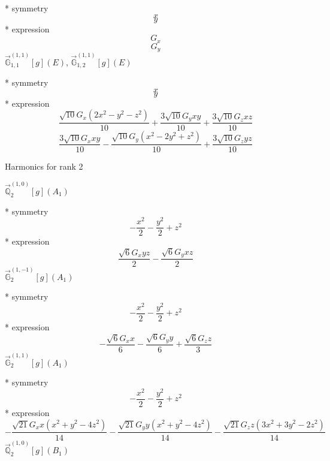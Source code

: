 \documentclass[fleqn,8pt]{jsarticle}
\begin{document}
\noindent\quad ** symmetry
\begin{dmath*}
x
\end{dmath*}
\begin{dmath*}
y
\end{dmath*}
\noindent\quad ** expression
\begin{dmath*}
G_{x}
\end{dmath*}
\begin{dmath*}
G_{y}
\end{dmath*}
\noindent\quad $\vec{\mathbb{G}}_{1,1}^{(1,1)}[g](E)$, $\vec{\mathbb{G}}_{1,2}^{(1,1)}[g](E)$

\noindent\quad ** symmetry
\begin{dmath*}
x
\end{dmath*}
\begin{dmath*}
y
\end{dmath*}
\noindent\quad ** expression
\begin{dmath*}
\frac{\sqrt{10} G_{x} \left(2 x^{2} - y^{2} - z^{2}\right)}{10} + \frac{3 \sqrt{10} G_{y} x y}{10} + \frac{3 \sqrt{10} G_{z} x z}{10}
\end{dmath*}
\begin{dmath*}
\frac{3 \sqrt{10} G_{x} x y}{10} - \frac{\sqrt{10} G_{y} \left(x^{2} - 2 y^{2} + z^{2}\right)}{10} + \frac{3 \sqrt{10} G_{z} y z}{10}
\end{dmath*}

\noindent * Harmonics for rank 2

\noindent\quad $\vec{\mathbb{Q}}_{2}^{(1,0)}[g](A_{1})$

\noindent\quad ** symmetry
\begin{dmath*}
- \frac{x^{2}}{2} - \frac{y^{2}}{2} + z^{2}
\end{dmath*}
\noindent\quad ** expression
\begin{dmath*}
\frac{\sqrt{6} G_{x} y z}{2} - \frac{\sqrt{6} G_{y} x z}{2}
\end{dmath*}
\noindent\quad $\vec{\mathbb{G}}_{2}^{(1,-1)}[g](A_{1})$

\noindent\quad ** symmetry
\begin{dmath*}
- \frac{x^{2}}{2} - \frac{y^{2}}{2} + z^{2}
\end{dmath*}
\noindent\quad ** expression
\begin{dmath*}
- \frac{\sqrt{6} G_{x} x}{6} - \frac{\sqrt{6} G_{y} y}{6} + \frac{\sqrt{6} G_{z} z}{3}
\end{dmath*}
\noindent\quad $\vec{\mathbb{G}}_{2}^{(1,1)}[g](A_{1})$

\noindent\quad ** symmetry
\begin{dmath*}
- \frac{x^{2}}{2} - \frac{y^{2}}{2} + z^{2}
\end{dmath*}
\noindent\quad ** expression
\begin{dmath*}
- \frac{\sqrt{21} G_{x} x \left(x^{2} + y^{2} - 4 z^{2}\right)}{14} - \frac{\sqrt{21} G_{y} y \left(x^{2} + y^{2} - 4 z^{2}\right)}{14} - \frac{\sqrt{21} G_{z} z \left(3 x^{2} + 3 y^{2} - 2 z^{2}\right)}{14}
\end{dmath*}
\noindent\quad $\vec{\mathbb{Q}}_{2}^{(1,0)}[g](B_{1})$
\end{document}
